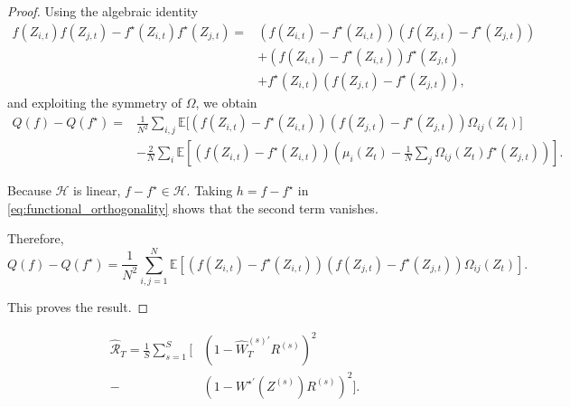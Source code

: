 \begin{proof}
Using the algebraic identity
\[
\begin{aligned}
f(Z_{i,t})f(Z_{j,t})
-f^\star(Z_{i,t})f^\star(Z_{j,t})
={}&
(f(Z_{i,t})-f^\star(Z_{i,t}))
(f(Z_{j,t})-f^\star(Z_{j,t}))\\
&+
(f(Z_{i,t})-f^\star(Z_{i,t}))
f^\star(Z_{j,t})\\
&+
f^\star(Z_{i,t})
(f(Z_{j,t})-f^\star(Z_{j,t})),
\end{aligned}
\]
and exploiting the symmetry of $\Omega$, we obtain
\[
\begin{aligned}
Q(f)-Q(f^\star)
={}&
\frac{1}{N^2}
\sum_{i,j}
\mathbb E\Big[
(f(Z_{i,t})-f^\star(Z_{i,t}))
(f(Z_{j,t})-f^\star(Z_{j,t}))
\Omega_{ij}(Z_t)
\Big]\\
&-
\frac{2}{N}
\sum_i
\mathbb E\left[
(f(Z_{i,t})-f^\star(Z_{i,t}))
\left(
\mu_i(Z_t)
-
\frac{1}{N}
\sum_j
\Omega_{ij}(Z_t)f^\star(Z_{j,t})
\right)
\right].
\end{aligned}
\]

Because $\mathcal H$ is linear,
$f-f^\star\in\mathcal H$.
Taking $h=f-f^\star$ in
\eqref{eq:functional_orthogonality}
shows that the second term vanishes.

Therefore,
\[
\boxed{
Q(f)-Q(f^\star)
=
\frac{1}{N^2}
\sum_{i,j=1}^{N}
\mathbb E\left[
(f(Z_{i,t})-f^\star(Z_{i,t}))
(f(Z_{j,t})-f^\star(Z_{j,t}))
\Omega_{ij}(Z_t)
\right].
}
\]

This proves the result.
\end{proof}




\begin{equation}
\label{eq:empirical_portfolio_regret}
\boxed{
\begin{aligned}
\widehat{\mathcal R}_T
=\frac{1}{S}\sum_{s=1}^{S}\Bigg[
&\left(1-\widehat W_T^{(s)\prime}R^{(s)}\right)^2\\
-&\left(1-W^{\star\prime}(Z^{(s)})R^{(s)}\right)^2
\Bigg].
\end{aligned}
}
\end{equation}
